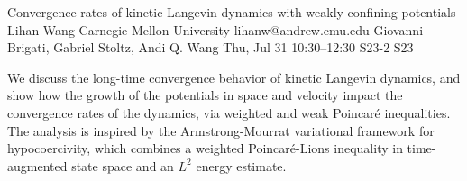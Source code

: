 \begin{talk}
  {Convergence rates of kinetic Langevin dynamics with weakly confining potentials}%
  {Lihan Wang}%
  {Carnegie Mellon University}%
  {lihanw@andrew.cmu.edu}%
  {Giovanni Brigati, Gabriel Stoltz, Andi Q. Wang}%
  {}%
  {Thu, Jul 31 10:30–12:30}%
  {S23-2}%
  {S23}%
  
				
			
We discuss the long-time convergence behavior of kinetic Langevin dynamics, and show how the growth of the potentials in space and velocity impact the convergence rates of the dynamics, via weighted and weak Poincar\'e inequalities. The analysis is inspired by the Armstrong-Mourrat variational framework for hypocoercivity, which combines a weighted Poincaré-Lions inequality in time-augmented state space and an $L^2$ energy estimate.


\end{talk}

